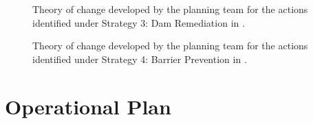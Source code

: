 \documentclass[
  letterpaper,
  DIV=11,
  numbers=noendperiod]{scrreprt}
\begin{document}
\begin{figure}


\caption{\label{fig-stra3}Theory of change developed by the planning
team for the actions identified under Strategy 3: Dam Remediation in .}

\end{figure}%

\begin{figure}


\caption{\label{fig-stra4}Theory of change developed by the planning
team for the actions identified under Strategy 4: Barrier Prevention in
.}

\end{figure}%

\section*{Operational Plan}\label{operational-plan-1}
\end{document}
